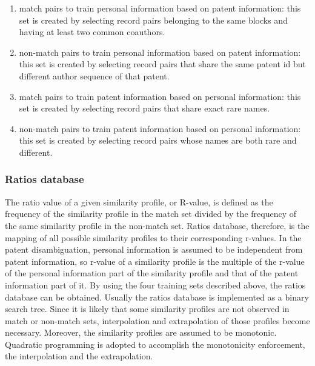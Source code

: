 \documentclass{article}
\begin{document}
\begin{enumerate}

\item match pairs to train personal information based 
on patent information: this set is created by selecting 
record pairs belonging to the same blocks and having at 
least two common coauthors.

\item non-match pairs to train personal information based 
on patent information: this set is created by
selecting record pairs that share the same patent id but 
different author sequence of that patent.

\item match pairs to train patent information based on 
personal information: this set is created by
selecting record pairs that share exact rare names.

\item non-match pairs to train patent information based on 
personal information: this set is created by
selecting record pairs whose names are both rare and different.

\end{enumerate}


\subsubsection{Ratios database}


The ratio value of a given similarity profile, or R-value, 
is defined as the frequency of the similarity profile in the 
match set divided by the frequency of the same similarity 
profile in the non-match set. Ratios database, therefore, 
is the mapping of all possible similarity profiles to 
their corresponding r-values. In the patent disambiguation, 
personal information is assumed to be independent from patent
information, so r-value of a similarity profile is the 
multiple of the r-value of the personal information
part of the similarity profile and that of the patent 
information part of it. By using the four training sets
described above, the ratios database can be obtained. Usually 
the ratios database is implemented as a binary search tree. 
Since it is likely that some similarity profiles are not 
observed in match or non-match sets, interpolation and 
extrapolation of those profiles become necessary. Moreover, the
similarity profiles are assumed to be monotonic. Quadratic 
programming is adopted to accomplish the monotonicity 
enforcement, the interpolation and the extrapolation.
\end{document}
